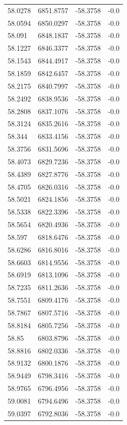 \begin{table}[H]
\begin{tabular}{llll}
58.0278 & 6851.8757 & -58.3758 & -0.0 \\
58.0594 & 6850.0297 & -58.3758 & -0.0 \\
58.091 & 6848.1837 & -58.3758 & -0.0 \\
58.1227 & 6846.3377 & -58.3758 & -0.0 \\
58.1543 & 6844.4917 & -58.3758 & -0.0 \\
58.1859 & 6842.6457 & -58.3758 & -0.0 \\
58.2175 & 6840.7997 & -58.3758 & -0.0 \\
58.2492 & 6838.9536 & -58.3758 & -0.0 \\
58.2808 & 6837.1076 & -58.3758 & -0.0 \\
58.3124 & 6835.2616 & -58.3758 & -0.0 \\
58.344 & 6833.4156 & -58.3758 & -0.0 \\
58.3756 & 6831.5696 & -58.3758 & -0.0 \\
58.4073 & 6829.7236 & -58.3758 & -0.0 \\
58.4389 & 6827.8776 & -58.3758 & -0.0 \\
58.4705 & 6826.0316 & -58.3758 & -0.0 \\
58.5021 & 6824.1856 & -58.3758 & -0.0 \\
58.5338 & 6822.3396 & -58.3758 & -0.0 \\
58.5654 & 6820.4936 & -58.3758 & -0.0 \\
58.597 & 6818.6476 & -58.3758 & -0.0 \\
58.6286 & 6816.8016 & -58.3758 & -0.0 \\
58.6603 & 6814.9556 & -58.3758 & -0.0 \\
58.6919 & 6813.1096 & -58.3758 & -0.0 \\
58.7235 & 6811.2636 & -58.3758 & -0.0 \\
58.7551 & 6809.4176 & -58.3758 & -0.0 \\
58.7867 & 6807.5716 & -58.3758 & -0.0 \\
58.8184 & 6805.7256 & -58.3758 & -0.0 \\
58.85 & 6803.8796 & -58.3758 & -0.0 \\
58.8816 & 6802.0336 & -58.3758 & -0.0 \\
58.9132 & 6800.1876 & -58.3758 & -0.0 \\
58.9449 & 6798.3416 & -58.3758 & -0.0 \\
58.9765 & 6796.4956 & -58.3758 & -0.0 \\
59.0081 & 6794.6496 & -58.3758 & -0.0 \\
59.0397 & 6792.8036 & -58.3758 & -0.0 \\

\end{tabular}
\end{table}
